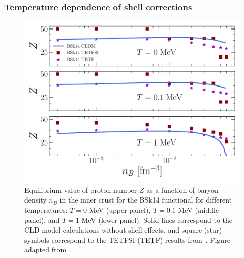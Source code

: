 \subsubsection{Temperature dependence of shell corrections}

\begin{figure}[!t]
  \begin{center}
    \includegraphics[width=0.9\linewidth]{figures/bsk14compo_vs_nb.pdf}
  \end{center}
  \caption[Equilbrium value of proton number versus baryon density in the inner
  crust for BSk14 at finite temperature]{Equilibrium value of proton number $Z$ 
    as a function of baryon density $n_B$ in the inner crust for the BSk14 
    functional for different temperatures: $T=0$ \si{\MeV} (upper panel), 
    $T=0.1$ \si{\MeV} (middle panel), and $T=1$ \si{\MeV} (lower panel). Solid 
    lines correspond to the 
    CLD model calculations without shell effects, and square (star) symbols 
    correspond to the TETFSI (TETF) results from~\cite{Onsi2008}. Figure 
    adapted from~\cite{Carreau2019}.}\label{fig:bsk14compo_vs_nb}
\end{figure}

